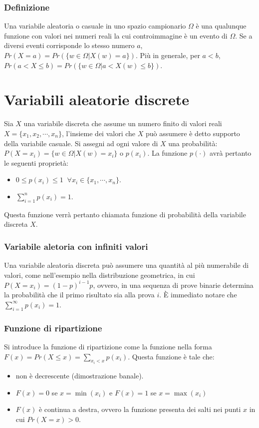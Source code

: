 \subsubsection{Definizione}
Una variabile aleatoria o casuale in uno spazio campionario $\Omega$ \`e una qualunque funzione con valori nei numeri reali la cui controimmagine \`e un evento di $\Omega$. Se
a diversi eventi corrisponde lo stesso numero $a$, $Pr(X=a)=Pr(\{w\in\Omega|X(w)=a\})$. Pi\`u in generale, per $a<b$, $Pr(a<X\le b)=Pr(\{w\in\Omega|a<X(w)\le b\})$.
\section{Variabili aleatorie discrete}
Sia $X$ una variabile discreta che assume un numero finito di valori reali $X=\{x_1,x_2,\cdots, x_n\}$, l'insieme dei valori che $X$ pu\`o assumere \`e detto supporto della
variabile casuale. Si assegni ad ogni valore di $X$ una probabilit\`a: $P(X=x_i)=\{w\in\Omega|X(w)=x_i\}$ o $p(x_i)$. La funzione $p(\cdot)$ avr\`a pertanto le seguenti 
propriet\`a:
\begin{itemize}
\item $0\le p(x_i)\le 1\;\;\forall x_i\in\{x_1,\cdots, x_n\}$.
\item $\sum\limits_{i=1}^{n}p(x_i)=1$.
\end{itemize}
Questa funzione verr\`a pertanto chiamata funzione di probabilit\`a della variabile discreta $X$. 
\subsubsection{Variabile aletoria con infiniti valori}
Una variabile aleatoria discreta pu\`o assumere una quantit\`a al pi\`u numerabile di valori, come nell'esempio nella distribuzione geometrica, in cui $P(X=x_i)=(1-p)^{i-1}p$, 
ovvero, in una sequenza di prove binarie determina la probabilit\`a che il primo risultato sia alla prova $i$. \`E immediato notare che $\sum\limits_{i=1}^\infty p(x_i)=1$.
\subsubsection{Funzione di ripartizione}
Si introduce la funzione di ripartizione come la funzione nella forma $F(x)=Pr(X\le x)=\sum\limits_{x_i<x}p(x_i)$. Questa funzione \`e tale che:
\begin{itemize}
\item non \`e decrescente (dimostrazione banale).
\item $F(x)=0$ se $x=\min(x_i)$ e $F(x)=1$ se $x=\max(x_i)$
\item $F(x)$ \`e continua a destra, ovvero la funzione presenta dei salti nei punti $x$ in cui $Pr(X=x)>0$.
\end{itemize}
